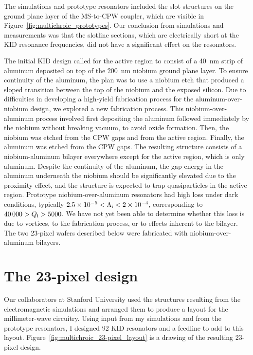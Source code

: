The simulations and prototype resonators included the slot structures on the ground plane layer of the MS-to-CPW coupler, which are visible in Figure~\ref{fig:multichroic_prototypes}.
Our conclusion from simulations and measurements was that the slotline sections, which are electrically short at the KID resonance frequencies, did not have a significant effect on the resonators.

The initial KID design called for the active region to consist of a \SI{40}{nm} strip of aluminum deposited on top of the \SI{200}{nm} niobium ground plane layer.
To ensure continuity of the aluminum, the plan was to use a niobium etch that produced a sloped transition between the top of the niobium and the exposed silicon.
Due to difficulties in developing a high-yield fabrication process for the aluminum-over-niobium design, we explored a new fabrication process.
This niobium-over-aluminum process involved first depositing the aluminum followed immediately by the niobium without breaking vacuum, to avoid oxide formation.
Then, the niobium was etched from the CPW gaps and from the active region.
Finally, the aluminum was etched from the CPW gaps.
The resulting structure consists of a niobium-aluminum bilayer everywhere except for the active region, which is only aluminum.
Despite the continuity of the aluminum, the gap energy in the aluminum underneath the niobium should be significantly elevated due to the proximity effect, and the structure is expected to trap quasiparticles in the active region.
Prototype niobium-over-aluminum resonators had high loss under dark conditions, typically
$\num{2.5e-5} < \Lambda_{\mathrm{i}} < \num{2e-4}$,
corresponding to 
$\num{40000} > Q_{\mathrm{i}} > \num{5000}$.
We have not yet been able to determine whether this loss is due to vortices, to the fabrication process, or to effects inherent to the bilayer.
The two 23-pixel wafers described below were fabricated with niobium-over-aluminum bilayers.


\section{The 23-pixel design}
\label{sec:multichroic.23-pixel}

Our collaborators at Stanford University used the structures resulting from the electromagnetic simulations and arranged them to produce a layout for the millimeter-wave circuitry. %
Using input from my simulations and from the prototype resonators, I designed 92 KID resonators and a feedline to add to this layout.
Figure~\ref{fig:multichroic_23-pixel_layout} is a drawing of the resulting 23-pixel design.

